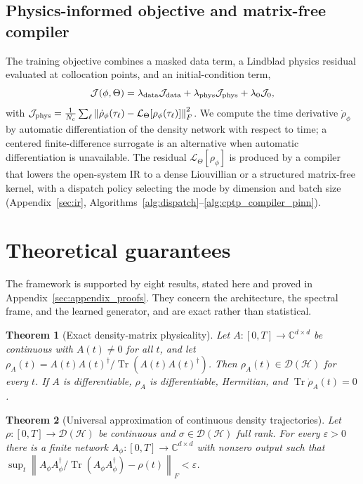 \documentclass[twocolumn,aps,prxquantum,superscriptaddress,nofootinbib,floatfix,longbibliography]{revtex4-2}
\newtheorem{theorem}{Theorem}
\DeclareMathOperator{\Tr}{Tr}
\newcommand{\C}{\mathbb{C}}
\newcommand{\calJ}{\mathcal{J}}
\newcommand{\calD}{\mathcal{D}}
\newcommand{\calL}{\mathcal{L}}
\newcommand{\eps}{\varepsilon}
\newcommand{\norm}[1]{\left\lVert #1 \right\rVert}
\newcommand{\hilb}{\mathcal{H}}
\newcommand{\rhophi}{\rho_{\phi}}
\begin{document}
\subsection{Physics-informed objective and matrix-free compiler}
\label{sec:framework_objective}
The training objective combines a masked data term, a Lindblad physics residual evaluated at collocation points, and an initial-condition term,
\begin{equation}
    \calJ(\phi,\Theta)=\lambda_{\rm data}\calJ_{\rm data}+\lambda_{\rm phys}\calJ_{\rm phys}+\lambda_0\calJ_0,
    \label{eq:pinn_general_loss}
\end{equation}
with $\calJ_{\rm phys}=\tfrac1{N_c}\sum_\ell\norm{\dot\rhophi(\tau_\ell)-\calL_\Theta[\rhophi(\tau_\ell)]}_F^2$. We compute the time derivative $\dot\rhophi$ by automatic differentiation of the density network with respect to time; a centered finite-difference surrogate is an alternative when automatic differentiation is unavailable. The residual $\calL_\Theta[\rhophi]$ is produced by a compiler that lowers the open-system IR to a dense Liouvillian or a structured matrix-free kernel, with a dispatch policy selecting the mode by dimension and batch size (Appendix~\ref{sec:ir}, Algorithms~\ref{alg:dispatch}--\ref{alg:cptp_compiler_pinn}).

\section{Theoretical guarantees}
\label{sec:guarantees}

The framework is supported by eight results, stated here and proved in Appendix~\ref{sec:appendix_proofs}. They concern the architecture, the spectral frame, and the learned generator, and are exact rather than statistical.

\begin{theorem}[Exact density-matrix physicality]
\label{thm:physicality}
Let $A:[0,T]\to\C^{d\times d}$ be continuous with $A(t)\ne0$ for all $t$, and let $\rho_A(t)=A(t)A(t)^\dagger/\Tr(A(t)A(t)^\dagger)$. Then $\rho_A(t)\in\calD(\hilb)$ for every $t$. If $A$ is differentiable, $\rho_A$ is differentiable, Hermitian, and $\Tr\dot\rho_A(t)=0$.
\end{theorem}

\begin{theorem}[Universal approximation of continuous density trajectories]
\label{thm:universal}
Let $\rho:[0,T]\to\calD(\hilb)$ be continuous and $\sigma\in\calD(\hilb)$ full rank. For every $\eps>0$ there is a finite network $A_\phi:[0,T]\to\C^{d\times d}$ with nonzero output such that $\sup_t\norm{A_\phi A_\phi^\dagger/\Tr(A_\phi A_\phi^\dagger)-\rho(t)}_F<\eps$.
\end{theorem}
\end{document}
